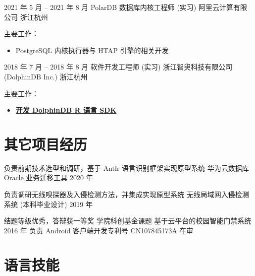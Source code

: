 \documentclass[11pt,a4paper,sans]{moderncv}   %
\begin{document}
\begin{CJK}{UTF8}{gbsn}
\cventry
{2021 年 5 月 -- 2021 年 8 月}
{PolarDB 数据库内核工程师 (实习)}
{阿里云计算有限公司}
{浙江杭州}
{}{主要工作：
\begin{itemize}%
  \item PostgreSQL 内核执行器与 HTAP 引擎的相关开发
\end{itemize}}

\cventry
{2018 年 7 月 -- 2018 年 8 月}
{软件开发工程师 (实习)}
{浙江智臾科技有限公司 (DolphinDB Inc.)}
{浙江杭州}
{}{主要工作：
\begin{itemize}%
  \item \textbf{
    \href{https://github.com/dolphindb/api-r}{开发 DolphinDB R 语言 SDK}
  }
\end{itemize}}


\section{其它项目经历}

\cventry{}
{负责前期技术选型和调研，基于 Antlr 语言识别框架实现原型系统}
{华为云数据库 Oracle 业务迁移工具}
{2020 年}{}{}

\cventry{}
{负责调研无线嗅探器及入侵检测方法，并集成实现原型系统}
{无线局域网入侵检测系统 (本科毕业设计)}
{2019 年}{}{
}

\cventry
{结题等级优秀，答辩获一等奖}
{学院科创基金课题}
{基于云平台的校园智能门禁系统}
{2016 年}
{负责 Android 客户端开发}{专利号 CN107845173A 在审}

\section{语言技能}


\end{CJK}
\end{document}
